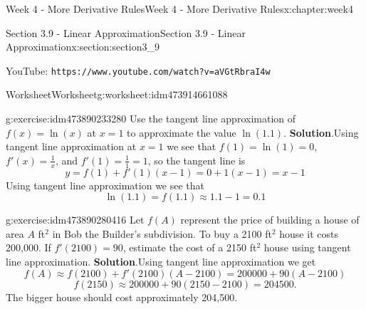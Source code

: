 \documentclass[oneside,10pt,]{book}
\newcommand{\blocktitlefont}{\relax}
\newcommand{\mono}[1]{\texttt{#1}}
\numberwithin{equation}{section}
\newlength{\qrsize}
\newlength{\previewwidth}
\begin{document}
\begin{chapterptx}{Week 4 - More Derivative Rules}{}{Week 4 - More Derivative Rules}{}{}{x:chapter:week4}
\begin{sectionptx}{Section 3.9 - Linear Approximation}{}{Section 3.9 - Linear Approximation}{}{}{x:section:section3_9}
\begin{tcbraster}[raster columns=2, raster column skip=1pt, raster halign=center, raster force size=false, raster left skip=0pt, raster right skip=0pt]
\begin{tcolorbox}[previewstyle, width=\previewwidth]
\end{tcolorbox}%
\begin{tcolorbox}[qrstyle]%
{\hypersetup{urlcolor=black}}%
\end{tcolorbox}%
\begin{tcolorbox}[captionstyle]%
\small YouTube: \mono{https://www.youtube.com/watch?v=aVGtRbraI4w}\end{tcolorbox}%
\end{tcbraster}%
%
%
\typeout{************************************************}
\typeout{************************************************}
%
\begin{worksheet-subsection}{Worksheet}{}{Worksheet}{}{}{g:worksheet:idm473914661088}
\begin{divisionexercise}{1}{}{}{g:exercise:idm473890233280}%
Use the tangent line approximation of \(f(x)=\ln(x)\) at \(x=1\) to approximate the value \(\ln(1.1)\).%
\textbf{\blocktitlefont Solution}.\hypertarget{g:solution:idm473890223312}{}\quad{}Using tangent line approximation at \(x=1\) we see that \(f(1)=\ln(1)=0\), \(f'(x) = \frac 1x\), and \(f'(1) = \frac 11 = 1\), so the tangent line is%
\begin{equation*}
y = f(1)+f'(1)(x-1) = 0 + 1(x-1) = x-1 
\end{equation*}
Using tangent line approximation we see that%
\begin{equation*}
\ln(1.1) = f(1.1) \approx 1.1-1 = 0.1 
\end{equation*}
%
\end{divisionexercise}%
\begin{divisionexercise}{2}{}{}{g:exercise:idm473890280416}%
Let \(f(A)\) represent the price of building a house of area \(A\) ft\(^2\) in Bob the Builder's subdivision. To buy a 2100 ft\(^2\) house it costs \textdollar{}200,000. If \(f'(2100)=90\), estimate the cost of a 2150 ft\(^2\) house using tangent line approximation.%
\textbf{\blocktitlefont Solution}.\hypertarget{g:solution:idm473890399504}{}\quad{}Using tangent line approximation we get%
\begin{equation*}
f(A)\approx f(2100)+f'(2100)(A-2100) = 200000+90(A-2100)
\end{equation*}
%
\begin{equation*}
f(2150)\approx 200000+90(2150-2100) = 204500\text{.}
\end{equation*}
The bigger house should cost approximately \textdollar{}204,500.%

\end{divisionexercise}
\end{worksheet-subsection}
\end{sectionptx}
\end{chapterptx}
\end{document}
